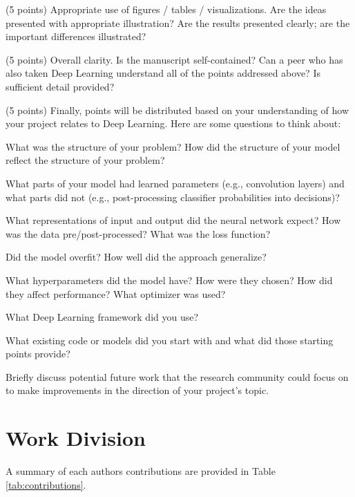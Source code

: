 \documentclass[10pt,twocolumn,letterpaper]{article}
\begin{document}
(5 points) Appropriate use of figures / tables / visualizations. Are the ideas presented with appropriate illustration? Are the results presented clearly; are the important differences illustrated? 

(5 points) Overall clarity. Is the manuscript self-contained? Can a peer who has also taken Deep Learning understand all of the points addressed above? Is sufficient detail provided? 

(5 points) Finally, points will be distributed based on your understanding of how your project relates to Deep Learning. Here are some questions to think about: 

What was the structure of your problem? How did the structure of your model reflect the structure of your problem? 

What parts of your model had learned parameters (e.g., convolution layers) and what parts did not (e.g., post-processing classifier probabilities into decisions)? 

What representations of input and output did the neural network expect? How was the data pre/post-processed?
What was the loss function? 

Did the model overfit? How well did the approach generalize? 

What hyperparameters did the model have? How were they chosen? How did they affect performance? What optimizer was used? 

What Deep Learning framework did you use? 

What existing code or models did you start with and what did those starting points provide? 

Briefly discuss potential future work that the research community could focus on to make improvements in the direction of your project's topic.



\section{Work Division}

A summary of each authors contributions are provided in Table \ref{tab:contributions}.



\end{document}
